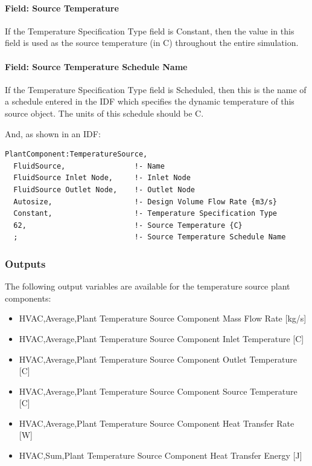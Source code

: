 \paragraph{Field: Source Temperature}\label{field-source-temperature}

If the Temperature Specification Type field is Constant, then the value in this field is used as the source temperature (in C) throughout the entire simulation.

\paragraph{Field: Source Temperature Schedule Name}\label{field-source-temperature-schedule-name}

If the Temperature Specification Type field is Scheduled, then this is the name of a schedule entered in the IDF which specifies the dynamic temperature of this source object. The units of this schedule should be C.

And, as shown in an IDF:

\begin{lstlisting}
PlantComponent:TemperatureSource,
  FluidSource,                !- Name
  FluidSource Inlet Node,     !- Inlet Node
  FluidSource Outlet Node,    !- Outlet Node
  Autosize,                   !- Design Volume Flow Rate {m3/s}
  Constant,                   !- Temperature Specification Type
  62,                         !- Source Temperature {C}
  ;                           !- Source Temperature Schedule Name
\end{lstlisting}

\subsubsection{Outputs}\label{outputs-16-000}

The following output variables are available for the temperature source plant components:

\begin{itemize}
    \item
    HVAC,Average,Plant Temperature Source Component Mass Flow Rate {[}kg/s{]}
    \item
    HVAC,Average,Plant Temperature Source Component Inlet Temperature {[}C{]}
    \item
    HVAC,Average,Plant Temperature Source Component Outlet Temperature {[}C{]}
    \item
    HVAC,Average,Plant Temperature Source Component Source Temperature {[}C{]}
    \item
    HVAC,Average,Plant Temperature Source Component Heat Transfer Rate {[}W{]}
    \item
    HVAC,Sum,Plant Temperature Source Component Heat Transfer Energy {[}J{]}
\end{itemize}

